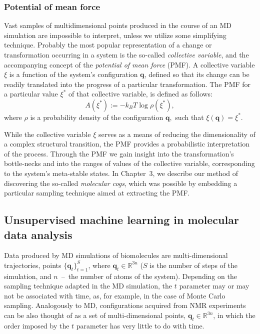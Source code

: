 \documentclass[a4paper,11pt,twoside]{book}%
\begin{document}
\subsubsection{Potential of mean force}

Vast samples of multidimensional points produced in the course of an MD simulation are impossible to interpret, unless we utilize some simplifying technique.
Probably the most popular representation of a change or transformation occurring in a system is the so-called \emph{collective variable}, and the accompanying concept of the \emph{potential of mean force} (PMF).
A collective variable $\xi$ is a function of the system's configuration $\mathbf{q}$, defined so that its change can be readily translated into the progress of a particular transformation.
The PMF for a particular value $\xi^*$ of that collective variable, is defined as follows: 
$$ A(\xi^*):=-k_BT\log \rho (\xi^*), $$ 
where $\rho$ is a probability density of the configuration $\mathbf{q},$ such that $\xi(\mathbf{q})=\xi^*$.

While the collective variable $\xi$ serves as a means of reducing the dimensionality of a complex structural transition, the PMF provides a probabilistic interpretation of the process.
Through the PMF we gain insight into the transformation's bottle-necks and into the ranges of values of the collective variable, corresponding to the system's meta-stable states.
In Chapter~3, we describe our method of discovering the so-called \emph{molecular cogs}, which was possible by embedding a particular sampling technique aimed at extracting the PMF.

\subsection{Unsupervised machine learning in molecular data analysis}

Data produced by MD simulations of biomolecules are multi-dimensional trajectories, points $\{ \mathbf{q}_t \}_{t=1}^S$, where $\mathbf{q}_t\in\mathbb{R}^{3n}$ ($S$ is the number of steps of the simulation, and $n$~--~the number of atoms of the system).
Depending on the sampling technique adapted in the MD simulation, the $t$ parameter may or may not be associated with time, as, for example, in the case of Monte Carlo sampling.
Analogously to MD, configurations acquired from NMR experiments can be also thought of as a set of multi-dimensional points, $\mathbf{q}_t\in\mathbb{R}^{3n}$, in which the order imposed by the $t$ parameter has very little to do with time.
\end{document}
